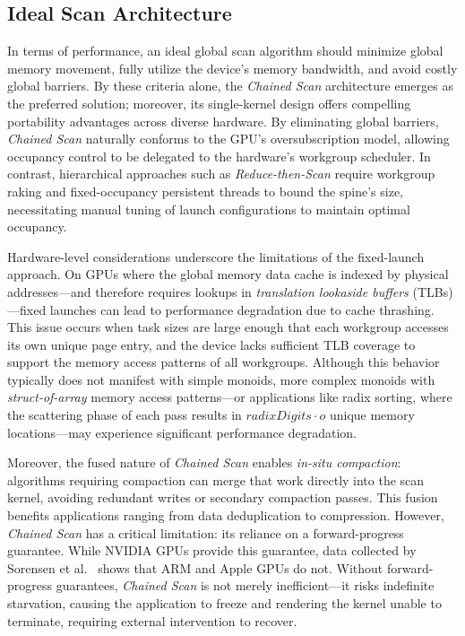 \documentclass[sigconf,screen]{acmart}
\begin{document}
\subsection{Ideal Scan Architecture}
In terms of performance, an ideal global scan algorithm should minimize global memory movement, fully utilize the device’s memory bandwidth, and avoid costly global barriers. By these criteria alone, the \emph{Chained Scan} architecture emerges as the preferred solution; moreover, its single-kernel design offers compelling portability advantages across diverse hardware. By eliminating global barriers, \emph{Chained Scan} naturally conforms to the GPU’s oversubscription model, allowing occupancy control to be delegated to the hardware's workgroup scheduler. In contrast, hierarchical approaches such as \emph{Reduce-then-Scan} require workgroup raking and fixed-occupancy persistent threads to bound the spine’s size, necessitating manual tuning of launch configurations to maintain optimal occupancy.

Hardware-level considerations underscore the limitations of the fixed-launch approach. On GPUs where the global memory data cache is indexed by physical addresses---and therefore requires lookups in \emph{translation lookaside buffers} (TLBs)---fixed launches can lead to performance degradation due to cache thrashing. This issue occurs when task sizes are large enough that each workgroup accesses its own unique page entry, and the device lacks sufficient TLB coverage to support the memory access patterns of all workgroups. Although this behavior typically does not manifest with simple monoids, more complex monoids with \emph{struct-of-array} memory access patterns---or applications like radix sorting, where the scattering phase of each pass results in $\textit{radixDigits} \cdot o$ unique memory locations---may experience significant performance degradation.

Moreover, the fused nature of \emph{Chained Scan} enables \emph{in-situ compaction}: algorithms requiring compaction can merge that work directly into the scan kernel, avoiding redundant writes or secondary compaction passes. This fusion benefits applications ranging from data deduplication to compression. However, \emph{Chained Scan} has a critical limitation: its reliance on a forward-progress guarantee. While NVIDIA GPUs provide this guarantee, data collected by Sorensen et al.~\cite{sorensen2021} shows that ARM and Apple GPUs do not. Without forward-progress guarantees, \emph{Chained Scan} is not merely inefficient---it risks indefinite starvation, causing the application to freeze and rendering the kernel unable to terminate, requiring external intervention to recover.
\end{document}
